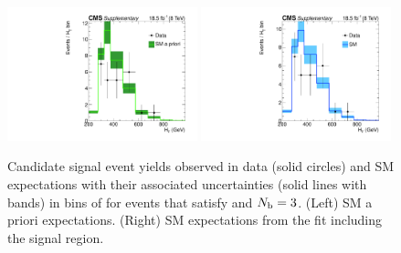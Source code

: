 \clearpage
\begin{figure}[h!]
  \begin{center}
    \includegraphics[width=0.49\textwidth,page=1]{figures/fit_result/bestFit_2012dev_RQcdZero_fZinvAll_3b_ge4j-1_smOnly} 
    \includegraphics[width=0.49\textwidth,page=1]{figures/fit_result/bestFit_2012dev_RQcdZero_fZinvAll_3b_ge4j-1h_smOnly} \\
    \caption{\label{fig:best-fit-0b} Candidate signal event yields
      observed in data (solid circles) and SM expectations with their
      associated uncertainties (solid lines with bands) in bins of
      \scalht for events that satisfy \njethigh and $N_{\text{b}} = 3$. (Left)
      SM a priori expectations. (Right) SM expectations from the fit
      including the signal region. }
  \end{center}
\end{figure}

